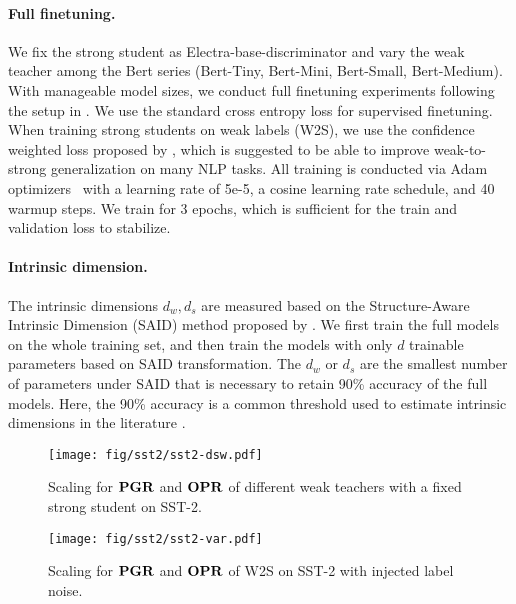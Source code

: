 \paragraph{Full finetuning.} We fix the strong student as Electra-base-discriminator \citep{clark2020electra} and vary the weak teacher among the Bert series \citep{turc2019bert-tiny} (Bert-Tiny, Bert-Mini, Bert-Small, Bert-Medium). 
With manageable model sizes, we conduct full finetuning experiments following the setup in \cite{burns2023weak}.
We use the standard cross entropy loss for supervised finetuning. 
When training strong students on weak labels (W2S), we use the confidence weighted loss proposed by \cite{burns2023weak}, which is suggested to be able to improve weak-to-strong generalization on many NLP tasks.
All training is conducted via Adam optimizers~\citep{kingma2014adam} with a learning rate of 5e-5, a cosine learning rate schedule, and 40 warmup steps. We train for 3 epochs, which is sufficient for the train and validation loss to stabilize. 

\paragraph{Intrinsic dimension.} The intrinsic dimensions $d_w,d_s$ are measured based on the Structure-Aware Intrinsic Dimension (SAID) method proposed by \cite{aghajanyan2020intrinsic}. We first train the full models on the whole training set, and then train the models with only $d$ trainable parameters based on SAID transformation. The $d_w$ or $d_s$ are the smallest number of parameters under SAID that is necessary to retain 90\% accuracy of the full models. Here, the 90\% accuracy is a common threshold used to estimate intrinsic dimensions in the literature \citep{li2018measuring}.

\begin{figure}[!h]
    \centering
    \texttt{[image: fig/sst2/sst2-dsw.pdf]}%
    \caption{Scaling for $\mathbf{PGR}$ and $\mathbf{OPR}$ of different weak teachers with a fixed strong student on SST-2.}\label{fig:sst2_dsw}
\end{figure}

\begin{figure}[!h]
    \centering
    \texttt{[image: fig/sst2/sst2-var.pdf]}%
    \caption{Scaling for $\mathbf{PGR}$ and $\mathbf{OPR}$ of W2S on SST-2 with injected label noise.}\label{fig:sst2_var}
\end{figure}

